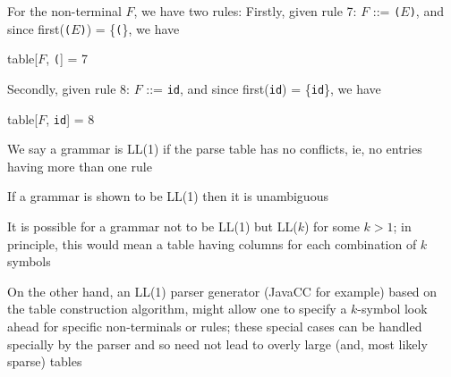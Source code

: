 \documentclass[8pt,a4paper,compress]{beamer}
\newcommand{\mm}[1]{$#1$}
\newenvironment{spaced}
{
\smallskip
\hspace{.5cm}
\begin{minipage}[c]{\textwidth}
}
{
\end{minipage}
\smallskip
}
\begin{document}
\begin{frame}[fragile]
\pause

For the non-terminal $F$, we have two rules: Firstly, given rule 7: $F$  ::= \lstinline{(}$E$\lstinline{)}, and since first(\lstinline{(}$E$\lstinline{)}) = \{\lstinline{(}\}, we have

\text{ }
\begin{spaced}
\begin{production}
table[\mm{F}, \lstinline{(}] = 7
\end{production}
\end{spaced}

\pause

Secondly, given rule 8: $F$  ::= \lstinline{id}, and since first(\lstinline{id}) = \{\lstinline{id}\}, we have

\text{ }
\begin{spaced}
\begin{production}
table[\mm{F}, \lstinline{id}] = 8
\end{production}
\end{spaced}

\pause

We say a grammar is LL(1) if the parse table has no conflicts, ie, no entries having more than one rule

\pause
\bigskip

If a grammar is shown to be LL(1) then it is unambiguous

\pause
\bigskip

It is possible for a grammar not to be LL(1) but LL($k$) for some $k > 1$; in principle, this would mean a table having columns for each combination of $k$ symbols

\pause
\bigskip

On the other hand, an LL(1) parser generator (JavaCC for example) based on the table construction algorithm, might allow one to specify a $k$-symbol look ahead for specific non-terminals or rules; these special cases can be handled specially by the parser and so need not lead to overly large (and, most likely sparse) tables
\end{frame}
\end{document}
